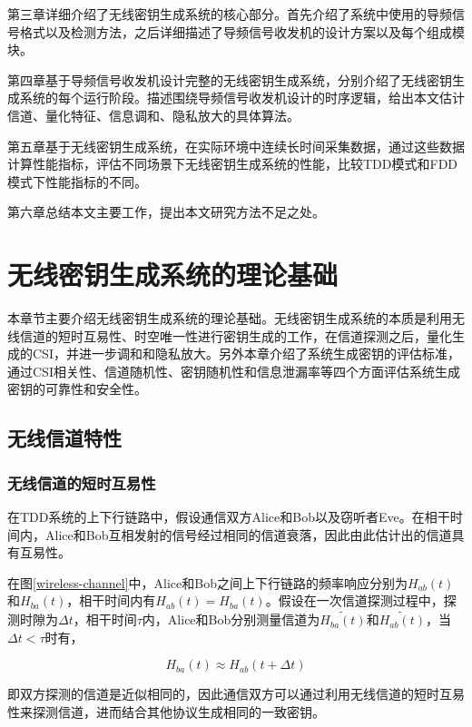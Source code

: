 \documentclass[master]{seuthesis} %
\begin{document}
\begin{Main}
第三章详细介绍了无线密钥生成系统的核心部分。首先介绍了系统中使用的导频信号格式以及检测方法，之后详细描述了导频信号收发机的设计方案以及每个组成模块。

第四章基于导频信号收发机设计完整的无线密钥生成系统，分别介绍了无线密钥生成系统的每个运行阶段。描述围绕导频信号收发机设计的时序逻辑，给出本文估计信道、量化特征、信息调和、隐私放大的具体算法。

第五章基于无线密钥生成系统，在实际环境中连续长时间采集数据，通过这些数据计算性能指标，评估不同场景下无线密钥生成系统的性能，比较TDD模式和FDD模式下性能指标的不同。

第六章总结本文主要工作，提出本文研究方法不足之处。

\chapter{无线密钥生成系统的理论基础}

本章节主要介绍无线密钥生成系统的理论基础。无线密钥生成系统的本质是利用无线信道的短时互易性、时空唯一性进行密钥生成的工作，在信道探测之后，量化生成的CSI，并进一步调和和隐私放大。另外本章介绍了系统生成密钥的评估标准，通过CSI相关性、信道随机性、密钥随机性和信息泄漏率等四个方面评估系统生成密钥的可靠性和安全性。

\section{无线信道特性}

\subsection{无线信道的短时互易性}

在TDD系统的上下行链路中，假设通信双方Alice和Bob以及窃听者Eve。在相干时间内，Alice和Bob互相发射的信号经过相同的信道衰落，因此由此估计出的信道具有互易性\cite{ye2010information}\cite{azimi2007robust}。

在图\ref{wireless-channel}中，Alice和Bob之间上下行链路的频率响应分别为$H_{ab}(t)$和$H_{ba}(t)$，相干时间内有$H_{ab}(t) = H_{ba}(t)$。假设在一次信道探测过程中，探测时隙为$\Delta t$，相干时间$\tau$内，Alice和Bob分别测量信道为$\tilde{H_{ba}(t)}$和$\tilde{H_{ab}(t)}$，当$ \Delta t < \tau $时有，

\begin{equation}
    H_{ba}(t) \approx H_{ab}(t + \Delta t)
\end{equation}

即双方探测的信道是近似相同的，因此通信双方可以通过利用无线信道的短时互易性来探测信道，进而结合其他协议生成相同的一致密钥。


\end{Main}
\end{document}
